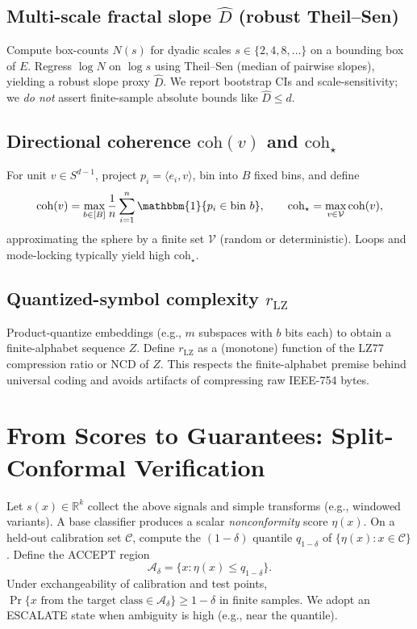 \documentclass[11pt]{article}
\begin{document}
\subsection{Multi-scale fractal slope $\hat D$ (robust Theil--Sen)}
Compute box-counts $N(s)$ for dyadic scales $s\in\{2,4,8,\dots\}$ on a bounding box of $E$. Regress $\log N$ on $\log s$ using Theil--Sen (median of pairwise slopes), yielding a robust slope proxy $\hat D$. We report bootstrap CIs and scale-sensitivity; we \emph{do not} assert finite-sample absolute bounds like $\hat D\le d$.

\subsection{Directional coherence $\mathrm{coh}(v)$ and $\mathrm{coh}_\star$}
For unit $v\in S^{d-1}$, project $p_i=\langle e_i,v\rangle$, bin into $B$ fixed bins, and define
\[
  \mathrm{coh}(v)=\max_{b\in[B]} \frac{1}{n}\sum_{i=1}^n \mathbbm{1}\{p_i\in \text{bin }b\},\qquad
  \mathrm{coh}_\star = \max_{v\in\mathcal{V}} \mathrm{coh}(v),
\]
approximating the sphere by a finite set $\mathcal{V}$ (random or deterministic). Loops and mode-locking typically yield high $\mathrm{coh}_\star$.

\subsection{Quantized-symbol complexity $r_{\mathrm{LZ}}$}
Product-quantize embeddings (e.g., $m$ subspaces with $b$ bits each) to obtain a finite-alphabet sequence $Z$. Define $r_{\mathrm{LZ}}$ as a (monotone) function of the LZ77 compression ratio or NCD of $Z$. This respects the finite-alphabet premise behind universal coding and avoids artifacts of compressing raw IEEE-754 bytes.

\section{From Scores to Guarantees: Split-Conformal Verification}
Let $s(x)\in\mathbb{R}^k$ collect the above signals and simple transforms (e.g., windowed variants). A base classifier produces a scalar \emph{nonconformity} score $\eta(x)$. On a held-out calibration set $\mathcal{C}$, compute the $(1-\delta)$ quantile $q_{1-\delta}$ of $\{\eta(x):x\in\mathcal{C}\}$. Define the \textsc{ACCEPT} region
\[
\mathcal{A}_\delta=\{x:\eta(x)\le q_{1-\delta}\}.
\]
Under exchangeability of calibration and test points, $\Pr\{x\text{ from the target class}\in\mathcal{A}_\delta\}\ge 1-\delta$ in finite samples. We adopt an \textsc{ESCALATE} state when ambiguity is high (e.g., near the quantile).
\end{document}
